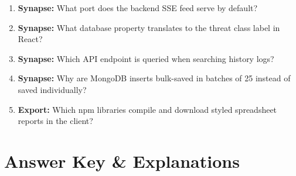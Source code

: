 \documentclass[11pt,a4paper]{report}
\begin{document}
\begin{enumerate}
  \item \textbf{Synapse:} What port does the backend SSE feed serve by default?
  \item \textbf{Synapse:} What database property translates to the threat class label in React?
  \item \textbf{Synapse:} Which API endpoint is queried when searching history logs?
  \item \textbf{Synapse:} Why are MongoDB inserts bulk-saved in batches of 25 instead of saved individually?
  \item \textbf{Export:} Which npm libraries compile and download styled spreadsheet reports in the client?
\end{enumerate}

\newpage
\section{Answer Key \& Explanations}
\end{document}
